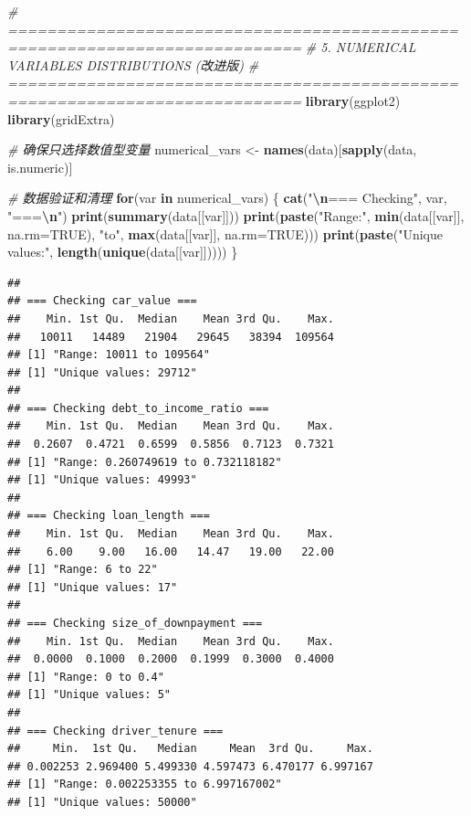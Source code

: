 \documentclass[
]{article}
\newenvironment{Shaded}{\begin{snugshade}}{\end{snugshade}}
\newcommand{\AttributeTok}[1]{\textcolor[rgb]{0.13,0.29,0.53}{#1}}
\newcommand{\CommentTok}[1]{\textcolor[rgb]{0.56,0.35,0.01}{\textit{#1}}}
\newcommand{\ConstantTok}[1]{\textcolor[rgb]{0.56,0.35,0.01}{#1}}
\newcommand{\ControlFlowTok}[1]{\textcolor[rgb]{0.13,0.29,0.53}{\textbf{#1}}}
\newcommand{\FunctionTok}[1]{\textcolor[rgb]{0.13,0.29,0.53}{\textbf{#1}}}
\newcommand{\NormalTok}[1]{#1}
\newcommand{\OtherTok}[1]{\textcolor[rgb]{0.56,0.35,0.01}{#1}}
\newcommand{\SpecialCharTok}[1]{\textcolor[rgb]{0.81,0.36,0.00}{\textbf{#1}}}
\newcommand{\StringTok}[1]{\textcolor[rgb]{0.31,0.60,0.02}{#1}}
\begin{document}
\begin{Shaded}
\begin{Highlighting}[]
\CommentTok{\# ============================================================================}
\CommentTok{\# 5. NUMERICAL VARIABLES DISTRIBUTIONS (改进版)}
\CommentTok{\# ============================================================================}
\FunctionTok{library}\NormalTok{(ggplot2)}
\FunctionTok{library}\NormalTok{(gridExtra)}

\CommentTok{\# 确保只选择数值型变量}
\NormalTok{numerical\_vars }\OtherTok{\textless{}{-}} \FunctionTok{names}\NormalTok{(data)[}\FunctionTok{sapply}\NormalTok{(data, is.numeric)]}

\CommentTok{\# 数据验证和清理}
\ControlFlowTok{for}\NormalTok{(var }\ControlFlowTok{in}\NormalTok{ numerical\_vars) \{}
  \FunctionTok{cat}\NormalTok{(}\StringTok{"}\SpecialCharTok{\textbackslash{}n}\StringTok{=== Checking"}\NormalTok{, var, }\StringTok{"===}\SpecialCharTok{\textbackslash{}n}\StringTok{"}\NormalTok{)}
  \FunctionTok{print}\NormalTok{(}\FunctionTok{summary}\NormalTok{(data[[var]]))}
  \FunctionTok{print}\NormalTok{(}\FunctionTok{paste}\NormalTok{(}\StringTok{"Range:"}\NormalTok{, }\FunctionTok{min}\NormalTok{(data[[var]], }\AttributeTok{na.rm=}\ConstantTok{TRUE}\NormalTok{), }\StringTok{"to"}\NormalTok{, }\FunctionTok{max}\NormalTok{(data[[var]], }\AttributeTok{na.rm=}\ConstantTok{TRUE}\NormalTok{)))}
  \FunctionTok{print}\NormalTok{(}\FunctionTok{paste}\NormalTok{(}\StringTok{"Unique values:"}\NormalTok{, }\FunctionTok{length}\NormalTok{(}\FunctionTok{unique}\NormalTok{(data[[var]]))))}
\NormalTok{\}}
\end{Highlighting}
\end{Shaded}

\begin{verbatim}
## 
## === Checking car_value ===
##    Min. 1st Qu.  Median    Mean 3rd Qu.    Max. 
##   10011   14489   21904   29645   38394  109564 
## [1] "Range: 10011 to 109564"
## [1] "Unique values: 29712"
## 
## === Checking debt_to_income_ratio ===
##    Min. 1st Qu.  Median    Mean 3rd Qu.    Max. 
##  0.2607  0.4721  0.6599  0.5856  0.7123  0.7321 
## [1] "Range: 0.260749619 to 0.732118182"
## [1] "Unique values: 49993"
## 
## === Checking loan_length ===
##    Min. 1st Qu.  Median    Mean 3rd Qu.    Max. 
##    6.00    9.00   16.00   14.47   19.00   22.00 
## [1] "Range: 6 to 22"
## [1] "Unique values: 17"
## 
## === Checking size_of_downpayment ===
##    Min. 1st Qu.  Median    Mean 3rd Qu.    Max. 
##  0.0000  0.1000  0.2000  0.1999  0.3000  0.4000 
## [1] "Range: 0 to 0.4"
## [1] "Unique values: 5"
## 
## === Checking driver_tenure ===
##     Min.  1st Qu.   Median     Mean  3rd Qu.     Max. 
## 0.002253 2.969400 5.499330 4.597473 6.470177 6.997167 
## [1] "Range: 0.002253355 to 6.997167002"
## [1] "Unique values: 50000"
\end{verbatim}
\end{document}
